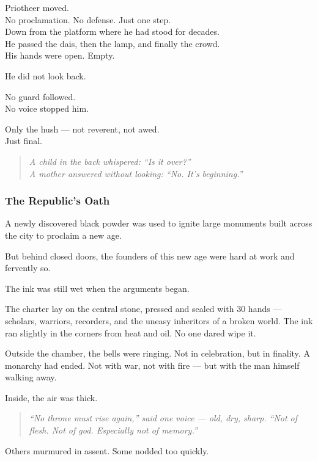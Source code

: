 \documentclass[12pt]{article}
\begin{document}
Priotheer moved.\\
No proclamation. No defense. Just one step.\\
Down from the platform where he had stood for decades.\\
He passed the dais, then the lamp, and finally the crowd.\\
His hands were open. Empty.

He did not look back.

No guard followed.\\
No voice stopped him.

Only the hush --- not reverent, not awed.\\
Just final.

\begin{quote}
\textit{A child in the back whispered: “Is it over?”}\\
\textit{A mother answered without looking: “No. It’s beginning.”}
\end{quote}

\dotfill

\subsubsection{The Republic’s Oath}

A newly discovered black powder was used to ignite large monuments built across the city to proclaim a new age.

But behind closed doors, the founders of this new age were hard at work and fervently so.

The ink was still wet when the arguments began.

The charter lay on the central stone, pressed and sealed with 30 hands --- scholars, warriors, recorders, and the uneasy inheritors of a broken world. The ink ran slightly in the corners from heat and oil. No one dared wipe it.

Outside the chamber, the bells were ringing. Not in celebration, but in finality. A monarchy had ended. Not with war, not with fire --- but with the man himself walking away.

Inside, the air was thick.

\begin{quote}
\textit{“No throne must rise again,” said one voice --- old, dry, sharp. “Not of flesh. Not of god. Especially not of memory.”}
\end{quote}

Others murmured in assent. Some nodded too quickly.
\end{document}
